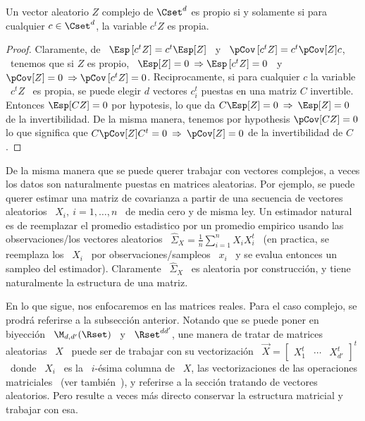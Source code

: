 \begin{teorema}\label{Teo:MP:PropioProy}
%
  Un vector  aleatorio $Z$ complejo de  $\Cset^d$ es propio si  y solamente si para
  cualquier $c \in \Cset^d$, la variable $c^t Z$ es propia.
\end{teorema}
\begin{proof}
  Claramente, de \  $\Esp\left[ c^t Z \right] = c^t \Esp[Z]$  \ y \ $\pCov\left[
    c^t Z \right] = c^t \pCov[Z] c$,  \ tenemos que si $Z$ es propio, \ $\Esp[Z]
  = 0  \: \Rightarrow  \Esp\left[ c^t  Z \right]  = 0$ \  y \  $\pCov[Z] =  0 \:
  \Rightarrow \pCov\left[  c^tZ \right] =  0$. \newline Reciprocamente,  si para
  cualquier $c$ la variable \ $c^t Z$  \ es propia, se puede elegir $d$ vectores
  $c_i^t$ puestas  en una matriz  $C$ invertible. Entonces  $\Esp[C Z] =  0$ por
  hypotesis, lo  que da  $C \Esp[Z] =  0 \:  \Rightarrow \: \Esp[Z]  = 0$  de la
  invertibilidad. De la misma manera, tenemos por hypothesis $\pCov[C Z] = 0$ lo
  que significa que  $C \pCov[Z] C^t = 0  \: \Rightarrow \: \pCov[Z] =  0$ de la
  invertibilidad de $C$.
\end{proof}



\label{Ssec:MP:MA}

De la misma manera que se  puede querer trabajar con vectores complejos, a veces
los datos son naturalmente puestas en matrices aleatorias. Por ejemplo, se puede
querer estimar  una matriz de covarianza  a partir de una  secuencia de vectores
aleatorios \  $X_i, \: i =  1, \ldots ,  n$ \ de media  cero y de misma  ley. Un
estimador  natural es  de reemplazar  el  promedio estadistico  por un  promedio
empirico usando las  observaciones/los vectores aleatorios \ $\widehat{\Sigma}_X
= \frac1n \sum_{i=1}^n X_i X_i^t$ \ (en practica, se reemplaza los \ $X_i$ \ por
observaciones/sampleos  \  $x_i$   \  y  se  evalua  entonces   un  sampleo  del
estimador). Claramente \ $\widehat{\Sigma}_X$ \ es aleatoria por construcci\'on,
y tiene naturalmente la estructura de una matriz.

En lo que sigue, nos enfocaremos  en las matrices reales. Para el caso complejo,
se prodr\'a referirse a la subsecci\'on  anterior. Notando que se puede poner en
biyecci\'on \ $\M_{d,d'}(\Rset)$  \ y \ $\Rset^{d d'}$, une  manera de tratar de
matrices  aleatorias \  $X$ \  puede ser  de trabajar  con su  vectorizaci\'on \
$\vec{X} = \begin{bmatrix} X_1^t &  \cdots & X_{d'}^t \end{bmatrix}^t$ \ donde \
$X_i$  \ es  la  \ $i$-\'esima  columna de  \  $X$, las  vectorizaciones de  las
operaciones  matriciales~\cite[Cap.~2]{MagNeu79}  (ver tambi\'en~\cite{NeuWan83,
  Har08}), y  referirse a  la secci\'on tratando  de vectores  aleatorios.  Pero
resulte a veces  m\'as directo conservar la estructura  matricial y trabajar con
esa.

